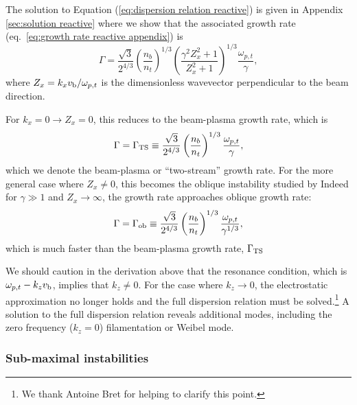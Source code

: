 \documentclass[usenatbib,iop,apj,numberedappendix]{aeb_emulateapj_2015}
\newcommand{\vbeam}{\ensuremath{v_{\rm b}}}
\begin{document}
The solution to Equation (\ref{eq:dispersion relation reactive}) is given in Appendix \ref{sec:solution reactive} where we show that the associated growth rate (eq.~\ref{eq:growth rate reactive appendix}) is 
\begin{equation}\label{eq:growth rate reactive}
 \Gamma = \frac{\sqrt{3}}{2^{4/3}}\left(\frac{n_b}{n_t}\right)^{1/3}\left(\frac{\gamma^2 Z_x^2 + 1}{Z_x^2 + 1}\right)^{1/3}\frac{\omega_{p,t}}{\gamma},
\end{equation}
where $Z_x = k_x\vbeam/\omega_{p,t}$ is the dimensionless wavevector perpendicular to the beam direction.

For $k_x = 0 \rightarrow Z_x = 0$, this reduces to the beam-plasma growth rate, which is
\begin{equation}\label{eq:growth rate bp}
 \Gamma = \Gamma_{\rm TS} \equiv \frac{\sqrt{3}}{2^{4/3}}\left(\frac{n_b}{n_t}\right)^{1/3}\frac{\omega_{p,t}}{\gamma},
\end{equation}
which we denote the beam-plasma or ``two-stream'' growth rate.
For the more general case where $Z_x\ne 0$, this becomes the oblique instability studied by \citet{Bret-Grem-Beni:10}  Indeed for $\gamma \gg 1$ and $Z_x \rightarrow \infty$, the growth rate approaches oblique growth rate:
\begin{equation}
 \Gamma = \Gamma_{\rm ob} \equiv \frac{\sqrt{3}}{2^{4/3}}\left(\frac{n_b}{n_t}\right)^{1/3}\frac{\omega_{p,t}}{\gamma^{1/3}},
\end{equation}
which is much faster than the beam-plasma growth rate, $\Gamma_{\rm TS}$

We should caution in the derivation above that the resonance condition, which is $\omega_{p,t} - k_z \vbeam$, implies that $k_z \neq 0$.  For the case where $k_z \rightarrow 0$, the electrostatic approximation no longer holds and the full dispersion relation must be solved.\footnote{We thank Antoine Bret for helping to clarify this point.}  A solution to the full dispersion relation reveals additional modes, including the zero frequency ($k_z = 0$) filamentation or Weibel mode. 

\subsubsection{Sub-maximal instabilities}
\end{document}
